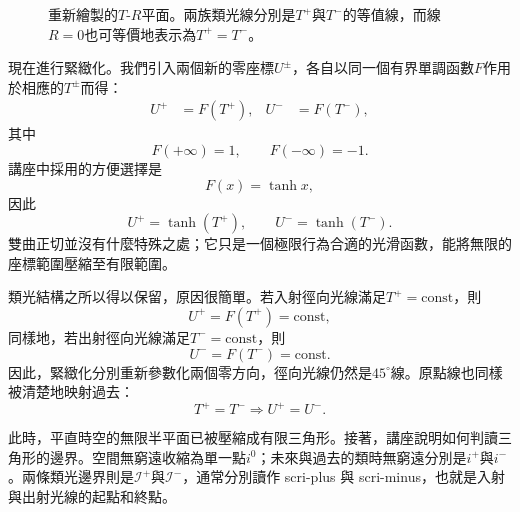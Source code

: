 \begin{figure}[htbp]
\centering
{}
\caption{重新繪製的\(T\)-\(R\)平面。兩族類光線分別是\(T^+\)與\(T^-\)的等值線，而線\(R=0\)也可等價地表示為\(T^+=T^-\)。}
\end{figure}

現在進行緊緻化。我們引入兩個新的零座標\(U^\pm\)，各自以同一個有界單調函數\(F\)作用於相應的\(T^\pm\)而得：
\begin{align}
U^+ &= F(T^+), &
U^- &= F(T^-),
\end{align}
其中
\begin{equation}
F(+\infty)=1,
\qquad
F(-\infty)=-1.
\end{equation}
講座中採用的方便選擇是
\begin{equation}
F(x)=\tanh x,
\end{equation}
因此
\begin{equation}
U^+ = \tanh(T^+),
\qquad
U^- = \tanh(T^-).
\end{equation}
雙曲正切並沒有什麼特殊之處；它只是一個極限行為合適的光滑函數，能將無限的座標範圍壓縮至有限範圍。

類光結構之所以得以保留，原因很簡單。若入射徑向光線滿足\(T^+=\text{const}\)，則
\[
U^+=F(T^+)=\text{const},
\]
同樣地，若出射徑向光線滿足\(T^-=\text{const}\)，則
\[
U^-=F(T^-)=\text{const}.
\]
因此，緊緻化分別重新參數化兩個零方向，徑向光線仍然是\(45^\circ\)線。原點線也同樣被清楚地映射過去：
\[
T^+=T^- \Longrightarrow U^+=U^-.
\]

此時，平直時空的無限半平面已被壓縮成有限三角形。接著，講座說明如何判讀三角形的邊界。空間無窮遠收縮為單一點\(i^0\)；未來與過去的類時無窮遠分別是\(i^+\)與\(i^-\)。兩條類光邊界則是\(\mathcal{I}^+\)與\(\mathcal{I}^-\)，通常分別讀作 scri-plus 與 scri-minus，也就是入射與出射光線的起點和終點。

